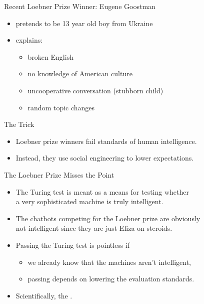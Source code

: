 \documentclass[xcolor={usenames,svgnames,x11names,dvipsnames,table}]{beamer}
\begin{document}
\begin{frame}{Recent Loebner Prize Winner: Eugene Goostman}
    \begin{itemize}
        \item pretends to be 13 year old boy from Ukraine
        \item explains:
            \begin{itemize}
                \item broken English
                \item no knowledge of American culture
                \item uncooperative conversation (stubborn child)
                \item random topic changes
            \end{itemize}
    \end{itemize}

    \begin{block}{The Trick}
        \begin{itemize}
            \item Loebner prize winners fail standards of human intelligence.
            \item Instead, they use social engineering to lower expectations.
        \end{itemize}
    \end{block}
\end{frame}

\begin{frame}{The Loebner Prize Misses the Point}
    \begin{itemize}
        \item The Turing test is meant as a means for testing whether\\
            a very sophisticated machine is truly intelligent.
        \item The chatbots competing for the Loebner prize are obviously\\
            not intelligent since they are just Eliza on steroids.
        \item Passing the Turing test is pointless if
            \begin{itemize}
                \item we already know that the machines aren't intelligent,
                \item passing depends on lowering the evaluation standards. 
            \end{itemize}
        \item Scientifically, the .
    \end{itemize}
\end{frame}
\end{document}
